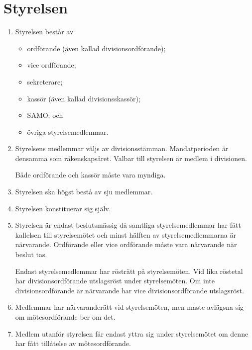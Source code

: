 \documentclass{dvd}
\begin{document}
	\section{Styrelsen}

	\begin{enumerate}[label=\arabic* §, ref=\arabic*]
		\item Styrelsen består av

		\begin{itemize}
			\item ordförande (även kallad divisionsordförande);

			\item vice ordförande;

			\item sekreterare;

			\item kassör (även kallad divisionsskassör);

			\item SAMO; och

			\item övriga styrelsemedlemmar.
		\end{itemize}

		\item Styrelsens medlemmar väljs av divisionsstämman.
		Mandatperioden är densamma som räkenskapsåret.
		Valbar till styrelsen är medlem i divisionen.

		Både ordförande och kassör måste vara myndiga.

		\item Styrelsen ska högst bestå av sju medlemmar.

		\item Styrelsen konstituerar sig själv.

		\item Styrelsen är endast beslutsmässig då samtliga styrelsemedlemmar har fått kallelsen till styrelsemötet och minst hälften av styrelsemedlemmarna är närvarande.
		Ordförande eller vice ordförande måste vara närvarande när beslut tas.
		
		Endast styrelsemedlemmar har rösträtt på styrelsemöten.
		Vid lika röstetal har divisionsordförande utslagsröst under styrelsemöten.
		Om inte divisionsordförande är närvarande har vice divisionsordförande utslagsröst.

		\item Medlemmar har närvaranderätt vid styrelsemöten, men måste avlägsna sig om mötesordförande ber om det.

		\item Medlem utanför styrelsen får endast yttra sig under styrelsemötet om denne har fått tillåtelse av mötesordförande.


\end{enumerate}
\end{document}
